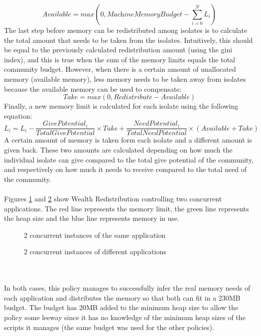\documentclass{l4proj}
\begin{document}
\begin{equation}
\textit{Available} = max(0,\textit{MachineMemoryBudget} - \sum_{i=0}^{N}L_i)
\end{equation}
\hspace*{1em} The last step before memory can be redistributed among isolates is to calculate the total amount that needs to be taken from the isolates. Intuitively, this should be equal to the previously calculated redistribution amount (using the gini index), and this is true when the sum of the memory limits equals the total community budget. However, when there is a certain amount of unallocated memory (available memory), less memory needs to be taken away from isolates because the available memory can be used to compensate:  
\begin{equation}
\textit{Take} = max(0,\textit{Redistribute} - \textit{Available})
\end{equation}
\hspace*{1em} Finally, a new memory limit is calculated for each isolate using the following equation:
\begin{equation}
L_i = L_i - \dfrac{\textit{GivePotential}_i}{\textit{TotalGivePotential}} \times Take + \dfrac{\textit{NeedPotential}_i}{\textit{TotalNeedPotential}}\times \left(Available + Take\right) 
\end{equation}
\hspace*{1em} A certain amount of memory is taken form each isolate and a different amount is given back. These two amounts are calculated depending on how much the individual isolate can give compared to the total give potential of the community, and respectively on how much it needs to receive compared to the total need of the community.
\\\\
\hspace*{1em} Figures \ref{wrd_eq} and \ref{wrd_df} show Wealth Redistribution controlling two concurrent applications. The red line represents the memory limit, the green line represents the heap size and the blue line represents memory in use.
\begin{figure}[!ht]
\caption{2 concurrent instances of the same application}
\label{wrd_eq}
\end{figure}
\begin{figure}[!ht]
\caption{2 concurrent instances of different applications}
\label{wrd_df}
\end{figure}
\\\\
\hspace*{1em} In both cases, this policy manages to successfully infer the real memory needs of each application and distributes the memory so that both can fit in a 230MB budget. The budget has 20MB added to the minimum heap size to allow the policy some leeway since it has no knowledge of the minimum heap sizes of the scripts it manages (the same budget was used for the other policies).
\end{document}
